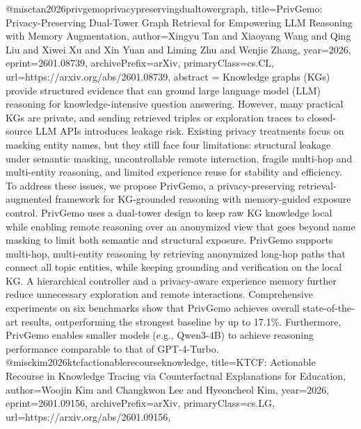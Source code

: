 {}@misc{tan2026privgemoprivacypreservingdualtowergraph,
      title={PrivGemo: Privacy-Preserving Dual-Tower Graph Retrieval for Empowering LLM Reasoning with Memory Augmentation}, 
      author={Xingyu Tan and Xiaoyang Wang and Qing Liu and Xiwei Xu and Xin Yuan and Liming Zhu and Wenjie Zhang},
      year={2026},
      eprint={2601.08739},
      archivePrefix={arXiv},
      primaryClass={cs.CL},
      url={https://arxiv.org/abs/2601.08739},
      abstract = {Knowledge graphs (KGs) provide structured evidence that can ground large language model (LLM) reasoning for knowledge-intensive question answering. However, many practical KGs are private, and sending retrieved triples or exploration traces to closed-source LLM APIs introduces leakage risk. Existing privacy treatments focus on masking entity names, but they still face four limitations: structural leakage under semantic masking, uncontrollable remote interaction, fragile multi-hop and multi-entity reasoning, and limited experience reuse for stability and efficiency. To address these issues, we propose PrivGemo, a privacy-preserving retrieval-augmented framework for KG-grounded reasoning with memory-guided exposure control. PrivGemo uses a dual-tower design to keep raw KG knowledge local while enabling remote reasoning over an anonymized view that goes beyond name masking to limit both semantic and structural exposure. PrivGemo supports multi-hop, multi-entity reasoning by retrieving anonymized long-hop paths that connect all topic entities, while keeping grounding and verification on the local KG. A hierarchical controller and a privacy-aware experience memory further reduce unnecessary exploration and remote interactions. Comprehensive experiments on six benchmarks show that PrivGemo achieves overall state-of-the-art results, outperforming the strongest baseline by up to 17.1\%. Furthermore, PrivGemo enables smaller models (e.g., Qwen3-4B) to achieve reasoning performance comparable to that of GPT-4-Turbo.}
}@misc{kim2026ktcfactionablerecourseknowledge,
      title={KTCF: Actionable Recourse in Knowledge Tracing via Counterfactual Explanations for Education}, 
      author={Woojin Kim and Changkwon Lee and Hyeoncheol Kim},
      year={2026},
      eprint={2601.09156},
      archivePrefix={arXiv},
      primaryClass={cs.LG},
      url={https://arxiv.org/abs/2601.09156},
}
